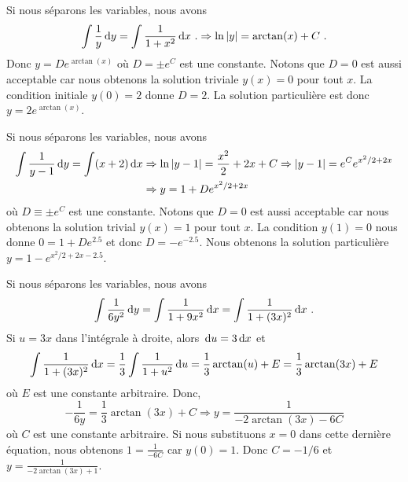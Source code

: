 { Si nous séparons les variables, nous avons
\[
\int \frac{1}{y} \,\mathrm{d}y = \int \frac{1}{1+x^2} \,\mathrm{d}x \ .
\Rightarrow
\ln|y| = \arctan(x) + C \ .
\]
Donc $\displaystyle y = D e^{\arctan(x)}$ où $D = \pm e^C$ est une
constante.  Notons que $D=0$ est aussi acceptable car nous obtenons la
solution triviale $y(x)=0$ pour tout $x$.  La condition initiale $y(0)=2$
donne $D=2$.  La solution particulière est donc
$\displaystyle y = 2 e^{\arctan(x)}$.

 Si nous séparons les variables, nous avons
\begin{align*}
\int \frac{1}{y-1} \,\mathrm{d}y = \int (x+2) \,\mathrm{d}x
&\Rightarrow  \ln|y-1| = \frac{x^2}{2} +2x +C
\Rightarrow |y - 1| = e^C e^{x^2/2 + 2x} \\
&\Rightarrow y = 1 + D e^{x^2/2 + 2x}
\end{align*}
où $D\equiv \pm e^C$ est une constante.  Notons que $D=0$ est aussi
acceptable car nous obtenons la solution trivial $y(x) = 1$ pour tout
$x$.  La condition $y(1)=0$ nous donne $0=1+De^{2.5}$ et donc 
$D=-e^{-2.5}$.  Nous obtenons la solution particulière
$\displaystyle y = 1 - e^{x^2/2 + 2x - 2.5}$.

 Si nous séparons les variables, nous avons
\[
\int \frac{1}{6y^2} \,\mathrm{d}y = \int \frac{1}{1+9x^2} \,\mathrm{d}x
= \int \frac{1}{1+(3x)^2} \,\mathrm{d}x \ .
\]
Si $u=3x$ dans l'intégrale à droite, alors $\,\mathrm{d}u = 3\,\mathrm{d}x$ et
\[
\int \frac{1}{1+(3x)^2} \,\mathrm{d}x = \frac{1}{3} \int \frac{1}{1+u^2} \,\mathrm{d}u
= \frac{1}{3} \arctan(u) + E
= \frac{1}{3} \arctan(3x) + E
\]
où $E$ est une constante arbitraire.  Donc,
\[
-\frac{1}{6y} = \frac{1}{3} \arctan(3x) + C
\Rightarrow y = \frac{1}{-2\arctan(3x)-6C}
\]
où $C$ est une constante arbitraire.  Si nous substituons $x=0$ dans cette
dernière équation, nous obtenons $\displaystyle 1 = \frac{1}{-6C}$ car
$\displaystyle y(0) = 1$.  Donc $C=-1/6$ et
$\displaystyle y = \frac{1}{-2\arctan(3x) + 1}$.
}

